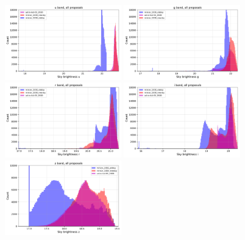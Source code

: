 \documentclass[DM,lsstdraft,authoryear,toc]{lsstdoc}
\begin{document}
\begin{figure}[ht]
\centering
\includegraphics[width=0.45\textwidth]{figures/skybrightness_u_band_ONED_ComboBinnedData}
\includegraphics[width=0.45\textwidth]{figures/skybrightness_g_band_ONED_ComboBinnedData} \\
\includegraphics[width=0.45\textwidth]{figures/skybrightness_r_band_ONED_ComboBinnedData} 
\includegraphics[width=0.45\textwidth]{figures/skybrightness_i_band_ONED_ComboBinnedData} \\
\includegraphics[width=0.45\textwidth]{figures/skybrightness_z_band_ONED_ComboBinnedData}

\end{figure}
\end{document}
